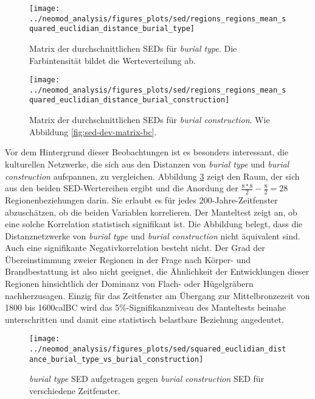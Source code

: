 \documentclass[openany,twoside,twocolumn]{book}
\begin{document}
\begin{figure}
\texttt{[image: ../neomod\_analysis/figures\_plots/sed/regions\_regions\_mean\_squared\_euclidian\_distance\_burial\_type]} \caption[Matrix der durchschnittlichen SEDs für \textit{burial type}]{Matrix der durchschnittlichen SEDs für \textit{burial type}. Die Farbintensität bildet die Werteverteilung ab.}\label{fig:sed-mean-matrix-bt}
\end{figure}

\begin{figure}
\texttt{[image: ../neomod\_analysis/figures\_plots/sed/regions\_regions\_mean\_squared\_euclidian\_distance\_burial\_construction]} \caption[Matrix der durchschnittlichen SEDs für \textit{burial construction}]{Matrix der durchschnittlichen SEDs für \textit{burial construction}. Wie Abbildung \ref{fig:sed-dev-matrix-bc}.}\label{fig:sed-mean-matrix-bc}
\end{figure}

Vor dem Hintergrund dieser Beobachtungen ist es besonders interessant,
die kulturellen Netzwerke, die sich aus den Distanzen von \emph{burial
type} und \emph{burial construction} aufspannen, zu vergleichen.
Abbildung \ref{fig:mantel-bt-bc} zeigt den Raum, der sich aus den beiden
SED-Wertereihen ergibt und die Anordung der
\(\frac{8*8}{2}-\frac{8}{2}=28\) Regionenbeziehungen darin. Sie erlaubt
es für jedes 200-Jahre-Zeitfenster abzuschätzen, ob die beiden Variablen
korrelieren. Der Manteltest zeigt an, ob eine solche Korrelation
statistisch signifikant ist. Die Abbildung belegt, dass die
Distanznetzwerke von \emph{burial type} und \emph{burial construction}
nicht äquivalent sind. Auch eine signifikante Negativkorrelation besteht
nicht. Der Grad der Übereinstimmung zweier Regionen in der Frage nach
Körper- und Brandbestattung ist also nicht geeignet, die Ähnlichkeit der
Entwicklungen dieser Regionen hinsichtlich der Dominanz von Flach- oder
Hügelgräbern nachherzusagen. Einzig für das Zeitfenster am Übergang zur
Mittelbronzezeit von 1800 bis 1600calBC wird das 5\%-Signifikanzniveau
des Manteltests beinahe unterschritten und damit eine statistisch
belastbare Beziehung angedeutet.

\begin{landscape}
\begin{figure}
\texttt{[image: ../neomod\_analysis/figures\_plots/sed/squared\_euclidian\_distance\_burial\_type\_vs\_burial\_construction]} \caption[\textit{burial type} SED aufgetragen gegen \textit{burial construction} SED für verschiedene Zeitfenster]{\textit{burial type} SED aufgetragen gegen \textit{burial construction} SED für verschiedene Zeitfenster.}\label{fig:mantel-bt-bc}
\end{figure}
\end{landscape}
\end{document}

